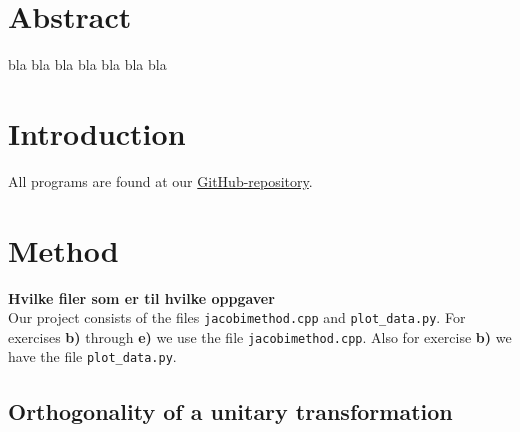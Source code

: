 \documentclass{article}
\begin{document}
\begin{multicols}{2}

\newpage
\clearpage

\vspace{1cm}

\section{Abstract} \label{sec:Abstract}

bla bla bla bla bla bla bla




\vspace{1cm}

\section{Introduction} \label{sec:Introduction}

All programs are found at our \href{https://github.com/Erikbgram/Fys3150}{GitHub-repository}. \\


\vspace{1cm}

\section{Method} \label{sec:Method}

\textbf{Hvilke filer som er til hvilke oppgaver} \\

Our project consists of the files \texttt{jacobimethod.cpp} and \texttt{plot\_data.py}. For exercises \textbf{b)} through \textbf{e)} we use the file \texttt{jacobimethod.cpp}. Also for exercise \textbf{b)} we have the file \texttt{plot\_data.py}.

\subsection{Orthogonality of a unitary transformation} \label{sec:orthogonality}


\end{multicols}
\end{document}
